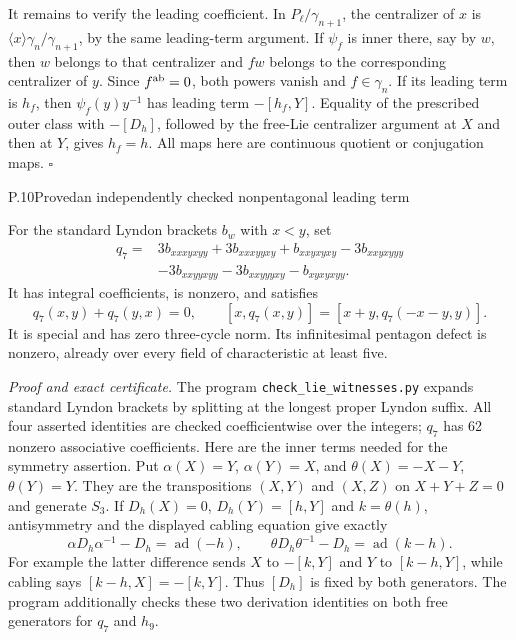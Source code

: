 It remains to verify the leading coefficient. In
$P_\ell/\gamma_{n+1}$, the centralizer of $x$ is
$\langle x\rangle\gamma_n/\gamma_{n+1}$, by the same leading-term
argument. If $\psi_f$ is inner there, say by $w$, then $w$ belongs
to that centralizer and $fw$ belongs to the corresponding centralizer
of $y$. Since $f^{\rm ab}=0$, both powers vanish and
$f\in\gamma_n$. If its leading term is $h_f$, then
$\psi_f(y)y^{-1}$ has leading term $-[h_f,Y]$.
Equality of the prescribed outer class with $-[D_h]$, followed by
the free-Lie centralizer argument at $X$ and then at $Y$, gives
$h_f=h$. All maps here are continuous quotient or conjugation maps.
\hfill$\square$

\begin{statement}{P.10}{Proved}{an independently checked nonpentagonal leading term}
\citep[equations (1.2)--(1.4)]{LiftCohen2001}
\end{statement}
For the standard Lyndon brackets $b_w$ with $x<y$, set
\[
\begin{split}
q_7={}&3b_{xxxyxyy}+3b_{xxxyyxy}+b_{xxyxyxy}
       -3b_{xxyxyyy}\\
     &-3b_{xxyyxyy}-3b_{xxyyyxy}-b_{xyxyxyy}.
\end{split}
\]
It has integral coefficients, is nonzero, and satisfies
\[
 q_7(x,y)+q_7(y,x)=0,\qquad
 [x,q_7(x,y)]=[x+y,q_7(-x-y,y)].
\]
It is special and has zero three-cycle norm. Its infinitesimal
pentagon defect is nonzero, already over every field of
characteristic at least five.

\emph{Proof and exact certificate.}
The program \texttt{check\_lie\_witnesses.py} expands standard
Lyndon brackets by splitting at the longest proper Lyndon suffix.
All four asserted identities are checked coefficientwise over the
integers; $q_7$ has 62 nonzero associative coefficients. Here are the
inner terms needed for the symmetry assertion. Put
$\alpha(X)=Y$, $\alpha(Y)=X$, and
$\theta(X)=-X-Y$, $\theta(Y)=Y$. They are the transpositions
$(X,Y)$ and $(X,Z)$ on $X+Y+Z=0$ and generate $S_3$. If
$D_h(X)=0$, $D_h(Y)=[h,Y]$ and $k=\theta(h)$, antisymmetry and
the displayed cabling equation give exactly
\[
 \alpha D_h\alpha^{-1}-D_h=\operatorname{ad}(-h),\qquad
 \theta D_h\theta^{-1}-D_h=\operatorname{ad}(k-h).
\]
For example the latter difference sends $X$ to $-[k,Y]$ and
$Y$ to $[k-h,Y]$, while cabling says
$[k-h,X]=-[k,Y]$. Thus $[D_h]$ is fixed by both generators.
The program additionally checks these two derivation identities on
both free generators for $q_7$ and $h_9$.

